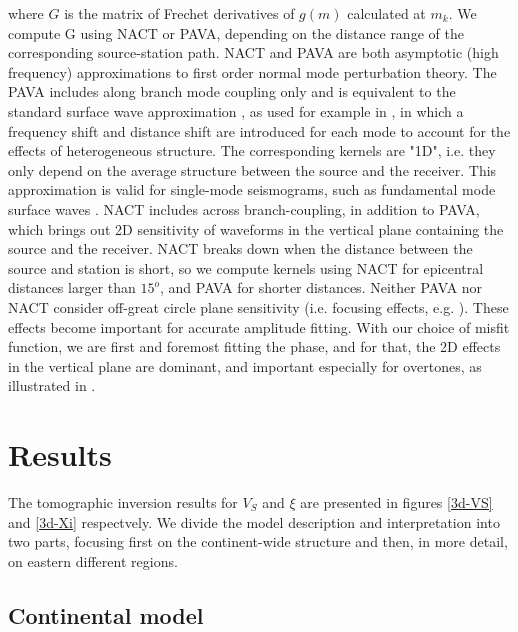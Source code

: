 \documentclass[12pt]{article}
\begin{document}
\noindent where $G$ is the matrix of Frechet derivatives of $g(m)$ calculated at $m_k$. We compute G using NACT or PAVA, depending on the distance range of the corresponding source-station path.
NACT and PAVA are both asymptotic (high frequency) approximations to first order normal mode perturbation theory. 
The PAVA includes along branch mode coupling only and is equivalent to the standard surface wave approximation \citep[e.g][]{mochizuki1986free,romanowicz1987multiplet}, as used for example in \cite{woodhouse1984mapping}, in which a frequency shift and distance shift are introduced for each mode to account for the effects of heterogeneous structure. 
The corresponding kernels are "1D", i.e. they only depend on the average structure between the source and the receiver. This approximation is valid for single-mode seismograms, such as fundamental mode surface waves \citep[e.g][]{romanowicz2008computation}.
NACT includes across branch-coupling, in addition to PAVA, which brings out 2D sensitivity of waveforms in the vertical plane containing the source and the receiver. NACT breaks down when the distance between the source and station is short, so we compute kernels using NACT for epicentral distances larger than $15^o$, and PAVA for shorter distances.
Neither PAVA nor NACT consider off-great circle plane sensitivity (i.e. focusing effects, e.g. \cite{zhou2005finite}). These effects become important for accurate amplitude fitting. With our choice of misfit function, we are first and foremost fitting the phase, and for that, the 2D effects in the vertical plane are dominant, and important especially for overtones, as illustrated in \cite{megnin1999effects,romanowicz2008computation}.


\section{Results}


	The tomographic inversion results for $V_S$ and $\xi$ are presented in figures \ref{3d-VS} and \ref{3d-Xi} respectvely. 
	We divide the model description and interpretation into two parts, focusing first on the continent-wide structure and then, in more detail, on eastern different regions.

	\subsection{Continental model}
\end{document}
